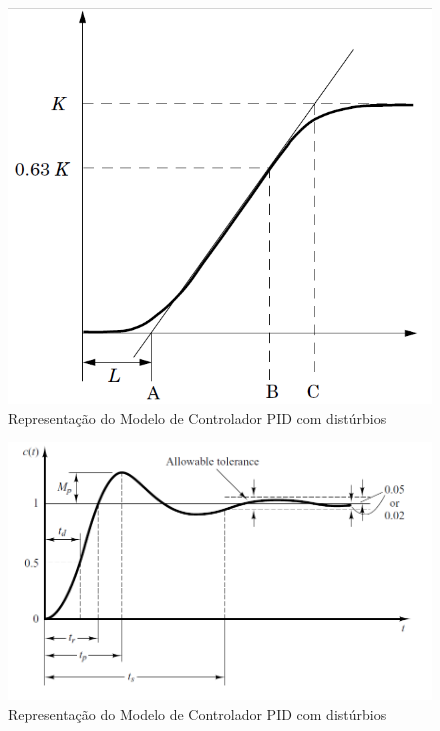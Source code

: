 \begin{figure}[htb]
  \caption{Representação do Modelo de Controlador PID com distúrbios}
  \begin{center}
      \includegraphics[scale=0.5]{img/transient_astrom_p17}
  \end{center}
\end{figure}

\begin{figure}[htb]
  \caption{Representação do Modelo de Controlador PID com distúrbios}
  \begin{center}
      \includegraphics[scale=0.5]{img/transient_ogata_p170}
  \end{center}
\end{figure}

